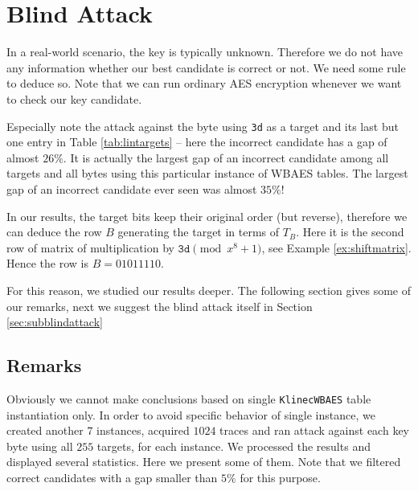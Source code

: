 \section{Blind Attack}
\label{sec:blindattack}

In a real-world scenario, the key is typically unknown. Therefore we do not have any information whether our best candidate is correct or not. We need some rule to deduce so. Note that we can run ordinary AES encryption whenever we want to check our key candidate.

\begin{remark}
\label{rem:false}
	Especially note the attack against the  byte using {\tt 3d} as a target and its last but one entry in Table \ref{tab:lintargets} -- here the incorrect candidate has a gap of almost $26\%$. It is actually the largest gap of an incorrect candidate among all targets and all bytes using this particular instance of WBAES tables. The largest gap of an incorrect candidate ever seen was almost $35\%$!
	
	In our results, the target bits keep their original order (but reverse), therefore we can deduce the row $B$ generating the target in terms of $T_B$. Here it is the second row of matrix of multiplication by $\texttt{3d}\pmod{x^8+1}$, see Example \ref{ex:shiftmatrix}. Hence the row is $B = 01011110$.
\end{remark}

For this reason, we studied our results deeper. The following section gives some of our remarks, next we suggest the blind attack itself in Section \ref{sec:subblindattack}



\subsection{Remarks}
\label{sec:remarks}

Obviously we cannot make conclusions based on single {\tt KlinecWBAES} table instantiation only. In order to avoid specific behavior of single instance, we created another $7$ instances, acquired $1024$ traces and ran attack against each key byte using all $255$ targets, for each instance. We processed the results and displayed several statistics. Here we present some of them. Note that we filtered correct candidates with a gap smaller than $5\%$ for this purpose.

